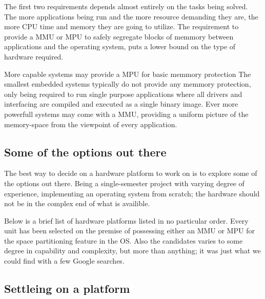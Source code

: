 The first two requirements depends almost entirely on the tasks being solved.
The more applications being run and the more resource demanding they are,
the more CPU time and memory they are going to utilize.
The requirement to provide a MMU or MPU to safely segregate blocks of memmory between applications and the operating system,
puts a lower bound on the type of hardware required.

More capable systems may provide a MPU for basic memmory protection
The smallest embedded systems typically do not provide any memmory protection,
only being required to run single purpose applications where all drivers and interfacing
are compiled and executed as a single binary image.
Ever more powerfull systems may come with a MMU,
providing a uniform picture of the memory-space from the viewpoint of every application.

\subsection{Some of the options out there}
The best way to decide on a hardware platform to work on is to explore some of the options out there.
Being a single-semester project with varying degree of experience,
implementing an operating system from scratch;
the hardware should not be in the complex end of what is availible.

Below is a brief list of hardware platforms listed in no particular order.
Every unit has been selected on the premise of possessing either an MMU or MPU for the space partitioning feature in the OS.
Also the candidates varies to some degree in capability and complexity,
but more than anything; it was just what we could find with a few Google searches.

\subsection{Settleing on a platform}


\section{}
